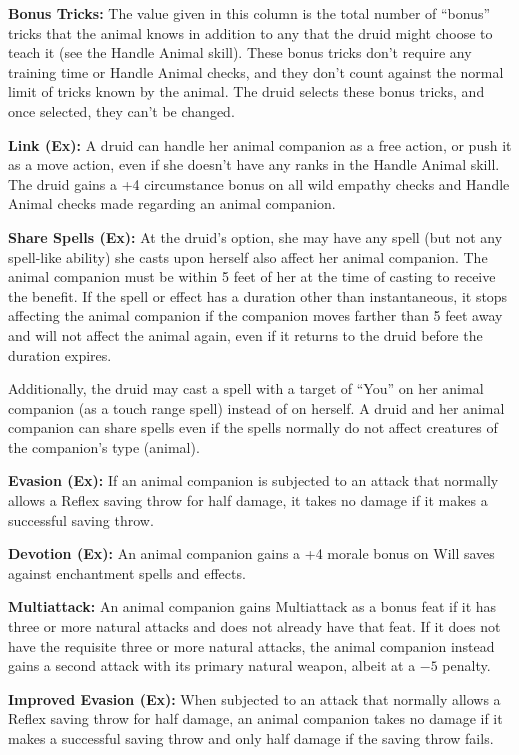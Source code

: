 {  \textbf{Bonus Tricks:} The value given in this column is the total number of ``bonus'' tricks that the animal knows in addition to any that the druid might choose to teach it (see the Handle Animal skill). These bonus tricks don't require any training time or Handle Animal checks, and they don't count against the normal limit of tricks known by the animal. The druid selects these bonus tricks, and once selected, they can't be changed.

  \textbf{Link (Ex):} A druid can handle her animal companion as a free action, or push it as a move action, even if she doesn't have any ranks in the Handle Animal skill. The druid gains a +4 circumstance bonus on all wild empathy checks and Handle Animal checks made regarding an animal companion.

  \textbf{Share Spells (Ex):} At the druid's option, she may have any spell (but not any spell-like ability) she casts upon herself also affect her animal companion. The animal companion must be within 5 feet of her at the time of casting to receive the benefit. If the spell or effect has a duration other than instantaneous, it stops affecting the animal companion if the companion moves farther than 5 feet away and will not affect the animal again, even if it returns to the druid before the duration expires.

  Additionally, the druid may cast a spell with a target of ``You'' on her animal companion (as a touch range spell) instead of on herself. A druid and her animal companion can share spells even if the spells normally do not affect creatures of the companion's type (animal).

  \textbf{Evasion (Ex):} If an animal companion is subjected to an attack that normally allows a Reflex saving throw for half damage, it takes no damage if it makes a successful saving throw.

  \textbf{Devotion (Ex):} An animal companion gains a +4 morale bonus on Will saves against enchantment spells and effects.

  \textbf{Multiattack:} An animal companion gains Multiattack as a bonus feat if it has three or more natural attacks and does not already have that feat. If it does not have the requisite three or more natural attacks, the animal companion instead gains a second attack with its primary natural weapon, albeit at a $-5$ penalty.

  \textbf{Improved Evasion (Ex):} When subjected to an attack that normally allows a Reflex saving throw for half damage, an animal companion takes no damage if it makes a successful saving throw and only half damage if the saving throw fails.

}
